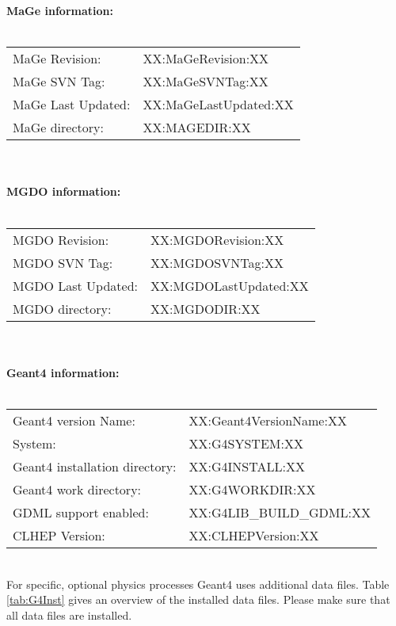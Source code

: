 \documentclass[pdftex, a4paper, 12pt,pointlessnumbers]{scrartcl} %
\begin{document}
\textbf{MaGe information:}\\
\vspace*{-0.1cm}\\
\begin{tabular}{l l}
  MaGe Revision: & {\color{RoyalBlue}XX:MaGeRevision:XX}\\
  MaGe SVN Tag: & {\color{RoyalBlue}XX:MaGeSVNTag:XX}\\
  MaGe Last Updated: & {\color{RoyalBlue}XX:MaGeLastUpdated:XX}\\
  MaGe directory: & {\color{RoyalBlue}XX:MAGEDIR:XX}\\
\end{tabular}
~\\
\vspace*{0.5cm}\\
\textbf{MGDO information:}\\
\vspace*{-0.1cm}\\
\begin{tabular}{l l}
  MGDO Revision: & {\color{RoyalBlue}XX:MGDORevision:XX}\\
  MGDO SVN Tag: & {\color{RoyalBlue}XX:MGDOSVNTag:XX}\\
  MGDO Last Updated: & {\color{RoyalBlue}XX:MGDOLastUpdated:XX}\\
  MGDO directory: & {\color{RoyalBlue}XX:MGDODIR:XX}\\
\end{tabular}
~\\
\vspace*{0.5cm}\\
\textbf{{\sc Geant4} information:}\\
\vspace*{-0.1cm}\\
\begin{tabular}{l l}
  {\sc Geant4} version Name: & {\color{RoyalBlue}XX:Geant4VersionName:XX}\\
  System: & {\color{RoyalBlue}XX:G4SYSTEM:XX}\\
  {\sc Geant4} installation directory: & {\color{RoyalBlue}XX:G4INSTALL:XX}\\
  {\sc Geant4} work directory: & {\color{RoyalBlue}XX:G4WORKDIR:XX}\\
  GDML support enabled: & XX:G4LIB_BUILD_GDML:XX\\
  CLHEP Version: & {\color{RoyalBlue}XX:CLHEPVersion:XX}\\
\end{tabular}

~\\
For specific, optional physics processes {\sc Geant4} uses additional data files. Table \ref{tab:G4Inst} gives an overview of the installed data files. Please make sure that all data files are installed.
\end{document}
